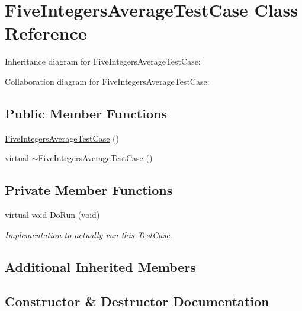 \hypertarget{classFiveIntegersAverageTestCase}{}\section{Five\+Integers\+Average\+Test\+Case Class Reference}
\label{classFiveIntegersAverageTestCase}


Inheritance diagram for Five\+Integers\+Average\+Test\+Case\+:


Collaboration diagram for Five\+Integers\+Average\+Test\+Case\+:
\subsection*{Public Member Functions}
\begin{DoxyCompactItemize}
\item 
\hyperlink{classFiveIntegersAverageTestCase_a90fd949abf374a6be5df4727d7447e54}{Five\+Integers\+Average\+Test\+Case} ()
\item 
virtual \hyperlink{classFiveIntegersAverageTestCase_a0e9729fb4a2859c298bae1277c9de2ae}{$\sim$\+Five\+Integers\+Average\+Test\+Case} ()
\end{DoxyCompactItemize}
\subsection*{Private Member Functions}
\begin{DoxyCompactItemize}
\item 
virtual void \hyperlink{classFiveIntegersAverageTestCase_aab1153b04e5f0c96cbefe3b438ac1bd1}{Do\+Run} (void)
\begin{DoxyCompactList}\small\item\em Implementation to actually run this Test\+Case. \end{DoxyCompactList}\end{DoxyCompactItemize}
\subsection*{Additional Inherited Members}


\subsection{Constructor \& Destructor Documentation}
